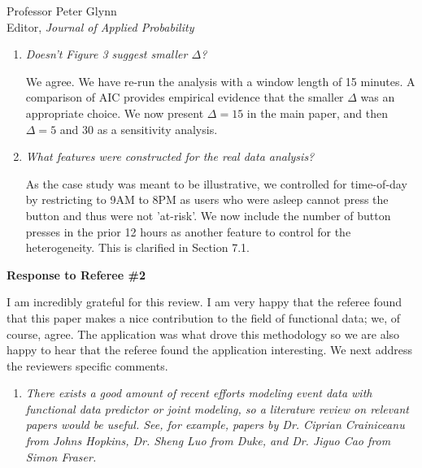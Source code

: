 \documentclass[11pt]{letter} %
\begin{document}
\begin{letter}{Professor
	Peter Glynn\\
	Editor, {\em Journal of Applied Probability}}
\begin{enumerate}
We have investigated this issue and there is a slight uptick in EDA but not in ACC; however, we are concerned that showing a longer history may not be helpful given our focus on a potentially shorter $\Delta$ based on the data analysis.  Therefore, we keep the plot as is, and note that there is a spike at 30-minutes for EDA while emphasizing that most of the signal appears in the 15-minute range.  This helps motivate our data adaptive choice of $\Delta$ in Section 7.1 which confirms that $\Delta = 15$ is the most appropriate choice although results are consistent across a range of $\Delta$ choices.
\vspace{5mm}


\item {\it Doesn’t Figure 3 suggest smaller $\Delta$?}

\vspace{5mm}
We agree.  We have re-run the analysis with a window length of 15 minutes.  A comparison of AIC provides empirical evidence that the smaller $\Delta$ was an appropriate choice.  We now present $\Delta = 15$ in the main paper, and then $\Delta =5$ and $30$ as a sensitivity analysis.
\vspace{5mm}

\item {\it What features were constructed for the real data analysis?}

\vspace{5mm}
As the case study was meant to be illustrative, we controlled for time-of-day by restricting to 9AM to 8PM as users who were asleep cannot press the button and thus were not 'at-risk'.  We now include the number of button presses in the prior 12 hours as another feature to control for the heterogeneity. This is clarified in Section 7.1.
\vspace{5mm}


\end{enumerate}

\newpage

{\bf Response to Referee \#2}

I am incredibly grateful for this review.  I am very happy that the referee found that this paper makes a nice contribution to the field of functional data; we, of course, agree. The application was what drove this methodology so we are also happy to hear that the referee found the application interesting. We next address the reviewers specific comments.

\begin{enumerate}
\item {\it There exists a good amount of recent efforts modeling event data with functional data predictor or joint modeling, so a literature review on relevant papers would be useful. See, for example, papers by Dr. Ciprian Crainiceanu from Johns Hopkins, Dr. Sheng Luo from Duke, and Dr. Jiguo Cao from Simon Fraser.}


\end{enumerate}
\end{letter}
\end{document}
